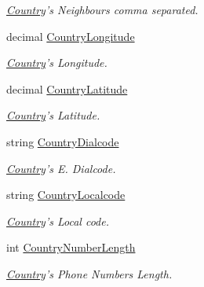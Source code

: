\begin{DoxyCompactItemize}
\begin{DoxyCompactList}\small\item\em \hyperlink{class_thecallr_api_1_1_objects_1_1_misc_1_1_country}{Country}'s Neighbours comma separated. \end{DoxyCompactList}\item 
decimal \hyperlink{class_thecallr_api_1_1_objects_1_1_misc_1_1_country_acf631d893a02b4f081522c6522d2dde2}{Country\+Longitude}
\begin{DoxyCompactList}\small\item\em \hyperlink{class_thecallr_api_1_1_objects_1_1_misc_1_1_country}{Country}'s Longitude. \end{DoxyCompactList}\item 
decimal \hyperlink{class_thecallr_api_1_1_objects_1_1_misc_1_1_country_a685dc4405582869d93d7af0b59078e1e}{Country\+Latitude}
\begin{DoxyCompactList}\small\item\em \hyperlink{class_thecallr_api_1_1_objects_1_1_misc_1_1_country}{Country}'s Latitude. \end{DoxyCompactList}\item 
string \hyperlink{class_thecallr_api_1_1_objects_1_1_misc_1_1_country_a8589fecc9228607d3eb57a33c0ba350f}{Country\+Dialcode}
\begin{DoxyCompactList}\small\item\em \hyperlink{class_thecallr_api_1_1_objects_1_1_misc_1_1_country}{Country}'s E. Dialcode. \end{DoxyCompactList}\item 
string \hyperlink{class_thecallr_api_1_1_objects_1_1_misc_1_1_country_a37f44dc37a8d928d89903f5f6e09ecad}{Country\+Localcode}
\begin{DoxyCompactList}\small\item\em \hyperlink{class_thecallr_api_1_1_objects_1_1_misc_1_1_country}{Country}'s Local code. \end{DoxyCompactList}\item 
int \hyperlink{class_thecallr_api_1_1_objects_1_1_misc_1_1_country_ab0e2b34c8e39eb40e9ae4cbfad2f5810}{Country\+Number\+Length}
\begin{DoxyCompactList}\small\item\em \hyperlink{class_thecallr_api_1_1_objects_1_1_misc_1_1_country}{Country}'s Phone Numbers Length. \end{DoxyCompactList}\end{DoxyCompactItemize}


